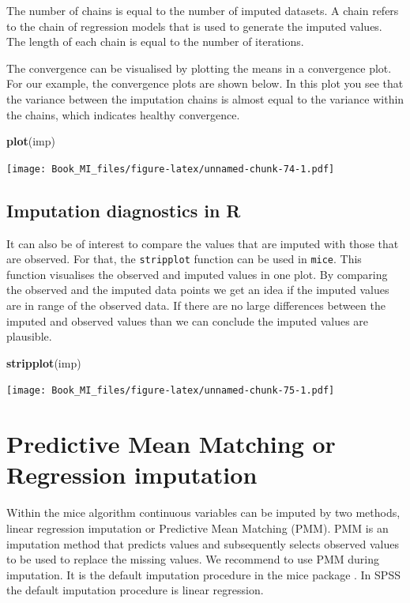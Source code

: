 \documentclass[]{book}
\newenvironment{Shaded}{\begin{snugshade}}{\end{snugshade}}
\newcommand{\KeywordTok}[1]{\textcolor[rgb]{0.13,0.29,0.53}{\textbf{#1}}}
\newcommand{\NormalTok}[1]{#1}
\begin{document}
The number of chains is equal to the number of imputed datasets. A chain
refers to the chain of regression models that is used to generate the
imputed values. The length of each chain is equal to the number of
iterations.

The convergence can be visualised by plotting the means in a convergence
plot. For our example, the convergence plots are shown below. In this
plot you see that the variance between the imputation chains is almost
equal to the variance within the chains, which indicates healthy
convergence.

\begin{Shaded}
\begin{Highlighting}[]
\KeywordTok{plot}\NormalTok{(imp)}
\end{Highlighting}
\end{Shaded}

\texttt{[image: Book\_MI\_files/figure-latex/unnamed-chunk-74-1.pdf]}

\subsection{Imputation diagnostics in
R}\label{imputation-diagnostics-in-r}

It can also be of interest to compare the values that are imputed with
those that are observed. For that, the \texttt{stripplot} function can
be used in \texttt{mice}. This function visualises the observed and
imputed values in one plot. By comparing the observed and the imputed
data points we get an idea if the imputed values are in range of the
observed data. If there are no large differences between the imputed and
observed values than we can conclude the imputed values are plausible.

\begin{Shaded}
\begin{Highlighting}[]
\KeywordTok{stripplot}\NormalTok{(imp)}
\end{Highlighting}
\end{Shaded}

\texttt{[image: Book\_MI\_files/figure-latex/unnamed-chunk-75-1.pdf]}

\section{Predictive Mean Matching or Regression
imputation}\label{predictive-mean-matching-or-regression-imputation}

Within the mice algorithm continuous variables can be imputed by two
methods, linear regression imputation or Predictive Mean Matching (PMM).
PMM is an imputation method that predicts values and subsequently
selects observed values to be used to replace the missing values. We
recommend to use PMM during imputation. It is the default imputation
procedure in the mice package \citep{Rubin1987}. In SPSS the default
imputation procedure is linear regression.
\end{document}
